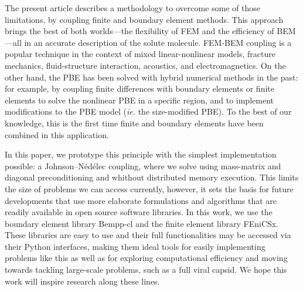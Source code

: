 The present article describes a methodology to overcome some of those limitations, by coupling finite and boundary element methods.
This approach brings the best of both worlds---the flexibility of FEM and the efficiency of BEM---all in an accurate description of the solute molecule.
FEM-BEM coupling is a popular technique in the context of mixed linear-nonlinear models,\cite{carstensen1995coupling,aurada2013classical} fracture mechanics,\cite{aour2007coupled} fluid-structure interaction,\cite{estorff1991fem} acoustics,\cite{hiptmair2006stabilized} and electromagnetics.\cite{matsuoka1988calculation,hiptmair2008stabilized,bruckner20123d}
On the other hand, the PBE has been solved with hybrid numerical methods in the past: for example, by coupling finite differences with boundary elements\cite{boschitsch2004hybrid} or finite elements\cite{xie2016new,ying2018hybrid} to solve the nonlinear PBE in a specific region, and to implement modifications to the PBE model ({\it ie.} the size-modified PBE).
To the best of our knowledge, this is the first time finite and boundary elements have been combined in this application.

In this paper, we prototype this principle with the simplest implementation possible: a Johnson--N\'ed\'elec\cite{johnson1980coupling} coupling, where we solve using mass-matrix and diagonal preconditioning and whithout distributed memory execution.
This limits the size of problems we can access currently, however, it sets the basis for future developments that use more elaborate formulations and algorithms that are readily available in open source software libraries.
In this work, we use the boundary element library Bempp-cl\cite{BetckeScroggs2021} and the finite element library FEniCSx\cite{BasixJoss,BasixDofTransformations}.
These libraries are easy to use and their full functionalities may be accessed via their Python interfaces, making them ideal tools for easily implementing problems like this as well as for exploring computational efficiency and moving towards tackling large-scale problems, such as a full viral capsid.\cite{MartinezETal2019,wang2021high}
We hope this work will inspire research along these lines.
